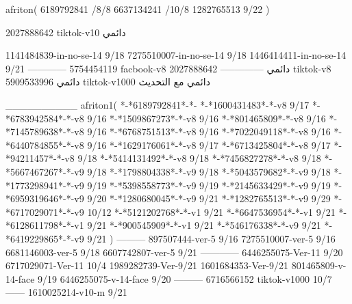 afriton(
6189792841 /8/8
6637134241 /10/8
1282765513 9/22
)

2027888642 tiktok-v10
دائمي



1141484839-in-no-se-14 9/18
7275510007-in-no-se-14 9/18
1446414411-in-no-se-14 9/21
------------
5754454119 facbook-v8
دائمي
--------------
2027888642 tiktok-v8
دائمي
5909533996 tiktok-v1000
دائمي مع التحديث

__________
afriton1(
*-*6189792841*-*-
*-*1600431483*-*-v8 9/17
*-*6783942584*-*-v8 9/16
*-*1509867273*-*-v8 9/16
*-*801465809*-*-v8 9/16
*-*7145789638*-*-v8 9/16
*-*6768751513*-*-v8 9/16
*-*7022049118*-*-v8 9/16
*-*6440784855*-*-v8 9/16
*-*1629176061*-*-v8 9/17
*-*6713425804*-*-v8 9/17
*-*94211457*-*-v8 9/18
*-*5414131492*-*-v8 9/18
*-*7456827278*-*-v8 9/18
*-*5667467267*-*-v9 9/18
*-*1798804338*-*-v9 9/18
*-*5043579682*-*-v9 9/18
*-*1773298941*-*-v9 9/19
*-*5398558773*-*-v9 9/19
*-*2145633429*-*-v9 9/19
*-*6959319646*-*-v9 9/20
*-*1280680045*-*-v9 9/21
*-*1282765513*-*-v9 9/29
*-*6717029071*-*-v9 10/12
*-*5121202768*-*-v1 9/21
*-*6647536954*-*-v1 9/21
*-*6128611798*-*-v1 9/21
*-*900545909*-*-v1 9/21
*-*546176338*-*-v9 9/21
*-*6419229865*-*-v9 9/21
)
---------
897507444-ver-5 9/16
7275510007-ver-5 9/16
6681146003-ver-5 9/18
6607742807-ver-5 9/21
------------
6446255075-Ver-11
9/20
6717029071-Ver-11
10/4
1989282739-Ver-9/21
1601684353-Ver-9/21
801465809-v-14-face 9/19
6446255075-v-14-face 9/20
---------
6716566152 tiktok-v1000
10/7
------
1610025214-v10-m 9/21
